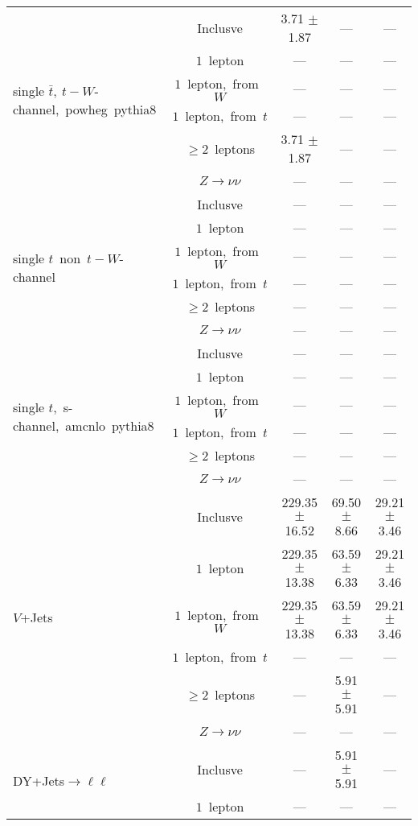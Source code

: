 \documentclass{article}
\begin{document}
\begin{longtable}{|l|c|c|c|c|}
\hline 
\multirow{6}{*}{single $\bar{t},~t-W$-channel,~powheg~pythia8} & Inclusve  & 3.71 $\pm$ 1.87  & ---  & --- \\* 
 & $1$~lepton  & ---  & ---  & --- \\* 
 & $1$~lepton,~from~$W$  & ---  & ---  & --- \\* 
 & $1$~lepton,~from~$t$  & ---  & ---  & --- \\* 
 & $\ge2$~leptons  & 3.71 $\pm$ 1.87  & ---  & --- \\* 
 & $Z\rightarrow\nu\nu$  & ---  & ---  & --- \\* 
\hline 
\multirow{6}{*}{single $t$~non~$t-W$-channel} & Inclusve  & ---  & ---  & --- \\* 
 & $1$~lepton  & ---  & ---  & --- \\* 
 & $1$~lepton,~from~$W$  & ---  & ---  & --- \\* 
 & $1$~lepton,~from~$t$  & ---  & ---  & --- \\* 
 & $\ge2$~leptons  & ---  & ---  & --- \\* 
 & $Z\rightarrow\nu\nu$  & ---  & ---  & --- \\* 
\hline 
\multirow{6}{*}{single $t$,~s-channel,~amcnlo~pythia8} & Inclusve  & ---  & ---  & --- \\* 
 & $1$~lepton  & ---  & ---  & --- \\* 
 & $1$~lepton,~from~$W$  & ---  & ---  & --- \\* 
 & $1$~lepton,~from~$t$  & ---  & ---  & --- \\* 
 & $\ge2$~leptons  & ---  & ---  & --- \\* 
 & $Z\rightarrow\nu\nu$  & ---  & ---  & --- \\* 
\hline 
\multirow{6}{*}{$V$+Jets} & Inclusve  & 229.35 $\pm$ 16.52  & 69.50 $\pm$ 8.66  & 29.21 $\pm$ 3.46 \\* 
 & $1$~lepton  & 229.35 $\pm$ 13.38  & 63.59 $\pm$ 6.33  & 29.21 $\pm$ 3.46 \\* 
 & $1$~lepton,~from~$W$  & 229.35 $\pm$ 13.38  & 63.59 $\pm$ 6.33  & 29.21 $\pm$ 3.46 \\* 
 & $1$~lepton,~from~$t$  & ---  & ---  & --- \\* 
 & $\ge2$~leptons  & ---  & 5.91 $\pm$ 5.91  & --- \\* 
 & $Z\rightarrow\nu\nu$  & ---  & ---  & --- \\* 
\hline 
\multirow{6}{*}{DY+Jets$\rightarrow\ell\ell$} & Inclusve  & ---  & 5.91 $\pm$ 5.91  & --- \\* 
 & $1$~lepton  & ---  & ---  & --- \\* 

\end{longtable}
\end{document}
